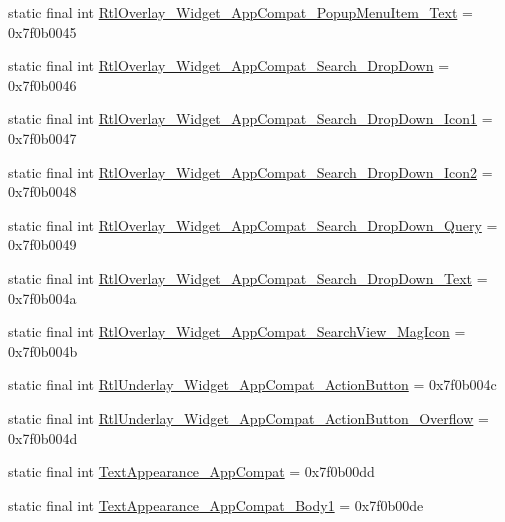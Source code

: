 \begin{CompactItemize}
\item 
static final int \hyperlink{classandroid_1_1support_1_1v7_1_1palette_1_1_r_1_1style_52c1213ddb010f9c07441644f170fd0a}{RtlOverlay\_\-Widget\_\-AppCompat\_\-PopupMenuItem\_\-Text} = 0x7f0b0045
\item 
static final int \hyperlink{classandroid_1_1support_1_1v7_1_1palette_1_1_r_1_1style_2fc52709f41c1ada1243629a2af31730}{RtlOverlay\_\-Widget\_\-AppCompat\_\-Search\_\-DropDown} = 0x7f0b0046
\item 
static final int \hyperlink{classandroid_1_1support_1_1v7_1_1palette_1_1_r_1_1style_021460f2103f8e88b6dce3f514aa0108}{RtlOverlay\_\-Widget\_\-AppCompat\_\-Search\_\-DropDown\_\-Icon1} = 0x7f0b0047
\item 
static final int \hyperlink{classandroid_1_1support_1_1v7_1_1palette_1_1_r_1_1style_430a82eff004fc7de421da59b4bbe1a5}{RtlOverlay\_\-Widget\_\-AppCompat\_\-Search\_\-DropDown\_\-Icon2} = 0x7f0b0048
\item 
static final int \hyperlink{classandroid_1_1support_1_1v7_1_1palette_1_1_r_1_1style_7036c9317fd2dfee51b0f136b2254754}{RtlOverlay\_\-Widget\_\-AppCompat\_\-Search\_\-DropDown\_\-Query} = 0x7f0b0049
\item 
static final int \hyperlink{classandroid_1_1support_1_1v7_1_1palette_1_1_r_1_1style_0cad0f6bc418c31d5d8d5c64c28265d0}{RtlOverlay\_\-Widget\_\-AppCompat\_\-Search\_\-DropDown\_\-Text} = 0x7f0b004a
\item 
static final int \hyperlink{classandroid_1_1support_1_1v7_1_1palette_1_1_r_1_1style_36ea5b89ed98e79cfcb4e5a76ce729a2}{RtlOverlay\_\-Widget\_\-AppCompat\_\-SearchView\_\-MagIcon} = 0x7f0b004b
\item 
static final int \hyperlink{classandroid_1_1support_1_1v7_1_1palette_1_1_r_1_1style_25d05689efb89fd2bbaf32e821b96366}{RtlUnderlay\_\-Widget\_\-AppCompat\_\-ActionButton} = 0x7f0b004c
\item 
static final int \hyperlink{classandroid_1_1support_1_1v7_1_1palette_1_1_r_1_1style_dafb4fef8541c942995f7b2cebb420bf}{RtlUnderlay\_\-Widget\_\-AppCompat\_\-ActionButton\_\-Overflow} = 0x7f0b004d
\item 
static final int \hyperlink{classandroid_1_1support_1_1v7_1_1palette_1_1_r_1_1style_24aa169c4364eee08c87f165b44361af}{TextAppearance\_\-AppCompat} = 0x7f0b00dd
\item 
static final int \hyperlink{classandroid_1_1support_1_1v7_1_1palette_1_1_r_1_1style_e17505a03bd3d5e1b6b7607599a85b56}{TextAppearance\_\-AppCompat\_\-Body1} = 0x7f0b00de
\item 

\end{CompactItemize}
